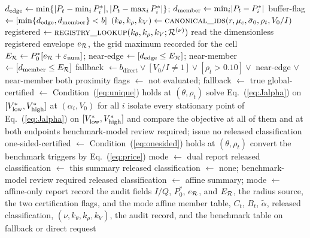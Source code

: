 \begin{algorithm*}[!t]
\begin{algorithmic}[1]
\State $d_{\mathrm{edge}}\gets\min\{\lvert P_t-\min_iP^{*}_{i}\rvert,\lvert P_t-\max_iP^{*}_{i}\rvert\}$; $d_{\mathrm{member}}\gets\min_i\lvert P_t-P^{*}_{i}\rvert$
\State buffer-flag $\gets[\min\{d_{\mathrm{edge}},d_{\mathrm{member}}\}<b]$ 
\State $(k_{\theta},k_{\rho},k_{V})\gets\textsc{canonical\_ids}(r,\mu_c,\bar{\sigma}_0,\rho_t,V_0/I)$
\State registered $\gets\textsc{registry\_lookup}(k_{\theta},k_{\rho},k_{V};\mathcal{R}^{(\nu)})$ 
  \State read the dimensionless registered envelope $e_{\mathcal{R}}$, the grid maximum recorded for the cell 
  \State $E_{\mathcal{R}}\gets P^{*}_{0}[e_{\mathcal{R}}+\varepsilon_{\mathrm{num}}]$; near-edge $\gets[d_{\mathrm{edge}}\le E_{\mathcal{R}}]$; near-member $\gets[d_{\mathrm{member}}\le E_{\mathcal{R}}]$
  \State fallback $\gets b_{\mathrm{direct}}\lor[V_0/I\neq1]\lor[\rho_t>0.10]\lor$ near-edge $\lor$ near-member
\Else
  \State both proximity flags $\gets$ not evaluated; fallback $\gets$ true
\EndIf
{}
  \State global-certified $\gets$ Condition~(\ref{eq:unique}) holds at $(\theta,\rho_t)$
    \State solve Eq.~(\ref{eq:Jalpha}) on $[V^{*}_{\mathrm{low}},V^{*}_{\mathrm{high}}]$ at $(\alpha_i,V_0)$ for all $i$
  \Else
    \State isolate every stationary point of Eq.~(\ref{eq:Jalpha}) on $[V^{*}_{\mathrm{low}},V^{*}_{\mathrm{high}}]$ and compare the objective at all of them and at both endpoints
      \State \Return benchmark-model review required; issue no released classification
    \EndIf
  \EndIf
  \State one-sided-certified $\gets$ Condition~(\ref{eq:onesided}) holds at $(\theta,\rho_t)$ 
  \State convert the benchmark triggers by Eq.~(\ref{eq:price})
  \State mode $\gets$ dual report
    \State released classification $\gets$ this summary 
  \Else
    \State released classification $\gets$ none; benchmark-model review required 
  \EndIf
\Else
  \State released classification $\gets$ affine summary; mode $\gets$ affine-only report
\EndIf
\State record the audit fields $I/Q$, $P^{*}_{0}$, $e_{\mathcal{R}}$, and $E_{\mathcal{R}}$, the radius source, the two certification flags, and the mode
\State \Return affine member table, $C_t$, $B_t$, $\tilde{\alpha}$, released classification, $(\nu,k_{\theta},k_{\rho},k_{V})$, the audit record, and the benchmark table on fallback or direct request
\end{algorithmic}
\end{algorithm*}
